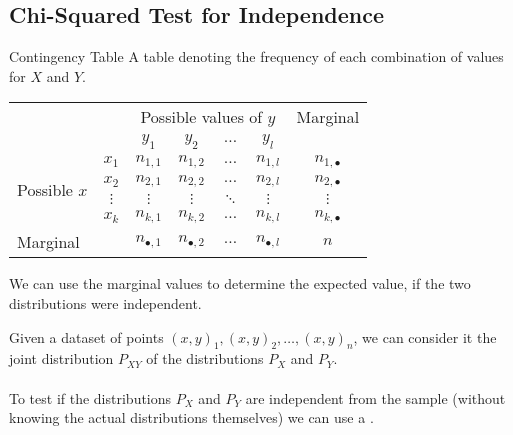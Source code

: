 \subsection{Chi-Squared Test for Independence}
\begin{definitionbox}{Contingency Table}
	A table denoting the frequency of each combination of values for $X$ and $Y$.
	\begin{center}
		\begin{tabular}{l c | c c c c | c}
			                              &          & \multicolumn{4}{c|}{Possible values of $y$} & Marginal                                                          \\
			                              &          & $y_1$                                       & $y_2$            & $\dots$  & $y_l$            &                  \\
			\hline
			\multirow{4}{*}{Possible $x$} & $x_1$    & $n_{1,1}$                                   & $n_{1,2}$        & $\dots$  & $n_{1,l}$        & $n_{1, \bullet}$ \\
			                              & $x_2$    & $n_{2,1}$                                   & $n_{2,2}$        & $\dots$  & $n_{2,l}$        & $n_{2, \bullet}$ \\
			                              & $\vdots$ & $\vdots$                                    & $\vdots$         & $\ddots$ & $\vdots$         & $\vdots$         \\
			                              & $x_k$    & $n_{k,1}$                                   & $n_{k,2}$        & $\dots$  & $n_{k,l}$        & $n_{k, \bullet}$ \\
			\hline
			Marginal                      &          & $n_{\bullet, 1}$                            & $n_{\bullet, 2}$ & $\dots$  & $n_{\bullet, l}$ & $n$              \\
		\end{tabular}
	\end{center}
	We can use the marginal values to determine the expected value, if the two distributions were independent.
\end{definitionbox}
Given a dataset of points $(x,y)_1, (x,y)_2, \dots, (x,y)_n$, we can consider it the joint distribution $P_{XY}$ of the distributions $P_X$ and $P_Y$.
\\
\\ To test if the distributions $P_X$ and $P_Y$ are independent from the sample (without knowing the actual distributions themselves) we can use a .
